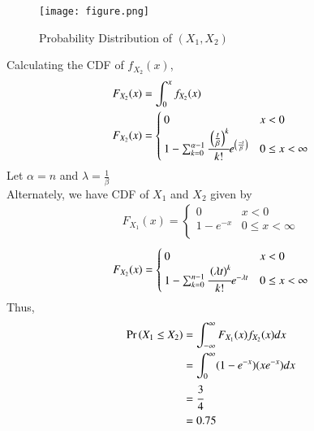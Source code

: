 \documentclass[journal,12pt,twocolumn]{IEEEtran}
\begin{document}
\begin{figure}[!ht]
\centering
\texttt{[image: figure.png]}
\caption{Probability Distribution of $(X_1, X_2)$}
\end{figure}

Calculating the CDF of $f_{X_2}(x)$,\\
\begin{align}
    F_{X_2}(x)&= \int_0^x f_{X_2}(x)\\
    F_{X_2}(x)&=
    \begin{cases}
    0 & x<0\\
    1- \sum_{k=0}^{\alpha-1} \cfrac{\left(\frac{t}{\beta}\right)^k}{k!}e^{\left(\frac{-t}{\beta}\right)} & 0 \le x <\infty
    \end{cases}
\end{align}
Let $\alpha=n$ and $\lambda=\frac{1}{\beta}$\\
Alternately, we have CDF of $X_1$ and $X_2$ given by 
\begin{align}
    F_{X_1}(x) = 
    \begin{cases}
     0   & x < 0\\
    1-e^{-x} & 0\le x < \infty\\
    \end{cases}
\end{align}
\begin{align}
    F_{X_2}(x) = 
    \begin{cases}
    0   & x < 0\\
     1- \sum_{k=0}^{n-1} \cfrac{\left(\lambda t\right)^k}{k!}e^{-\lambda t} & 0\le x < \infty\\
    \end{cases}
\end{align}
Thus, 
\begin{align}
    \Pr\left(X_1\le X_2\right) &= \int_{-\infty}^{\infty} F_{X_1}(x)f_{X_2}(x)dx\\
                &= \int_0^\infty(1-e^{-x})(xe^{-x})dx\\
                &= \cfrac{3}{4}\\
                &= 0.75
\end{align}
\end{document}
